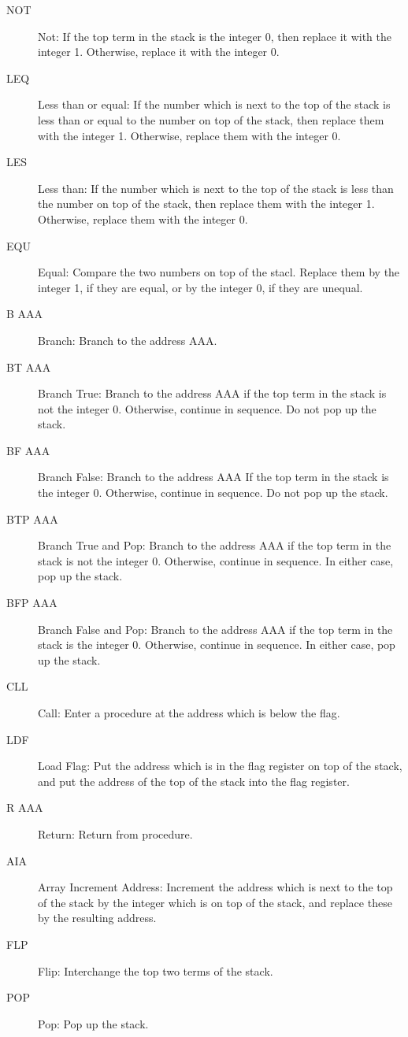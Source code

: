 \documentclass[twocolumn]{article}
\begin{document}
\begin{description}
\item[NOT] Not: If the top term in the stack is the integer 0, then replace
it with the integer 1. Otherwise, replace it with the integer 0.
\item[LEQ] Less than or equal: If the number which is next to the top of the
stack is less than or equal to the number on top of the stack, then replace
them with the integer 1. Otherwise, replace them with the integer 0.
\item[LES] Less than: If the number which is next to the top of the stack is
less than the number on top of the stack, then replace them with the integer
1. Otherwise, replace them with the integer 0.
\item[EQU] Equal: Compare the two numbers on top of the stacl.
Replace them by the integer 1, if they are equal, or by the integer 0, if 
they are unequal.
\item[B   AAA] Branch: Branch to the address AAA.
\item[BT  AAA] Branch True: Branch to the address AAA if the top term in
the stack is not the integer 0. Otherwise, continue in sequence.
Do not pop up the stack.
\item[BF  AAA] Branch False: Branch to the address AAA If the top term in
the stack is the integer 0. Otherwise, continue in sequence.
Do not pop up the stack.
\item[BTP AAA] Branch True and Pop: Branch to the address AAA if the top
term in the stack is not the integer 0. Otherwise, continue in sequence.
In either case, pop up the stack.
\item[BFP AAA] Branch False and Pop: Branch to the address AAA if the
top term in the stack is the integer 0.
Otherwise, continue in sequence.
In either case, pop up the stack.
\item[CLL] Call: Enter a procedure at the address which is below the flag.
\item[LDF] Load Flag: Put the address which is in the flag register on top
of the stack, and put the address of the top of the stack into the flag register.
\item[R   AAA] Return: Return from procedure.
\item[AIA] Array Increment Address: Increment the address which is next
to the top of the stack by the integer which is on top of the stack, and
replace these by the resulting address.
\item[FLP] Flip: Interchange the top two terms of the stack.
\item[POP] Pop: Pop up the stack.

\end{description}
\end{document}
